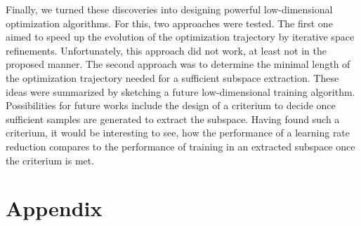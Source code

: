 \documentclass[11pt, a4paper]{article}
\begin{document}
Finally, we turned these discoveries into designing powerful low-dimensional optimization algorithms. For this, two approaches were tested. The first one aimed to speed up the evolution of the optimization trajectory by iterative space refinements. Unfortunately, this approach did not work, at least not in the proposed manner. The second approach was to determine the minimal length of the optimization trajectory needed for a sufficient subspace extraction. These ideas were summarized by sketching a future low-dimensional training algorithm. \\

Possibilities for future works include the design of a criterium to decide once sufficient samples are generated to extract the subspace. Having found such a criterium, it would be interesting to see, how the performance of a learning rate reduction compares to the performance of training in an extracted subspace once the criterium is met.

\appendix

\section{Appendix}
\end{document}
